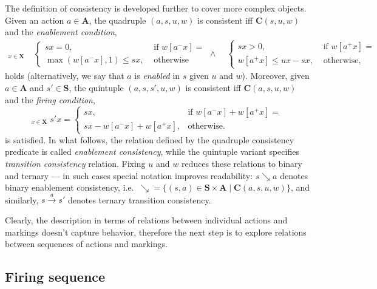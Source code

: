 \documentclass [a4paper,12pt] {article}
\theoremstyle{definition}
\newcommand{\Forall}{}
\DeclareRobustCommand{\Forall}{\mathop{\mathlarger{\forall}}}
\newcommand{\xtop}{}
\DeclareRobustCommand{\xtop}{\mathop{\textstyle\mathsmaller{\bm\top}}}
\begin{document}
The definition of consistency is developed further to cover more
complex objects.  Given an action $a \in \mathbf {A}$, the quadruple
$(a, s, u, w)$ is consistent iff $\bm {C}(s, u, w)$ and the {\em
  enablement condition}\/,
%
\begin {align}\label {eq:enablement-condition}
  \Forall_{x \in \mathbf {X}}\;&%
  \begin {cases}
    sx = 0, &\textrm { if } w[a^-x] = \xtop\\
    \max(w[a^-x],1) \leq sx, &\textrm { otherwise}
  \end {cases}
  \land\;&%
  \begin {cases}
    sx > 0, &\textrm { if } w[a^+x] = \xtop\\
    w[a^+x] \leq ux - sx, &\textrm { otherwise},
  \end {cases}
\end {align}
%
holds (alternatively, we say that $a$ is {\em enabled}\/ in $s$ given
$u$ and $w$).  Moreover, given $a \in \mathbf {A}$ and $s' \in \mathbf
{S}$, the quintuple $(a, s, s', u, w)$ is consistent iff $\bm {C}(a,
s, u, w)$ and the {\em firing condition}\/,
%
\begin {equation}\label {eq:firing-condition}
\Forall_{x \in \mathbf {X}}\; s'x =
\begin {cases}
sx,& \text {if } w[a^-x] + w[a^+x] = \xtop\\
sx - w[a^-x] + w[a^+x],& \text {otherwise.}
\end {cases}
\end {equation}
%
is satisfied.  In what follows, the relation defined by the quadruple
consistency predicate is called {\em enablement consistency}\/, while
the quintuple variant specifies {\em transition consistency}\/
relation.  Fixing $u$ and $w$ reduces these relations to binary and
ternary --- in such cases special notation improves readability:
$s\searrow a$ denotes binary enablement consistency, i.e.\ $\searrow =
\{ (s, a) \in \mathbf {S} \times \mathbf {A} \;|\; \bm {C}(a, s, u, w)
\}$, and similarly, $s\overset{a}{\rightarrow}s'$ denotes ternary
transition consistency.

Clearly, the description in terms of relations between individual
actions and markings doesn't capture behavior, therefore the next step
is to explore relations between sequences of actions and markings.

\subsection {Firing sequence}
\end{document}
